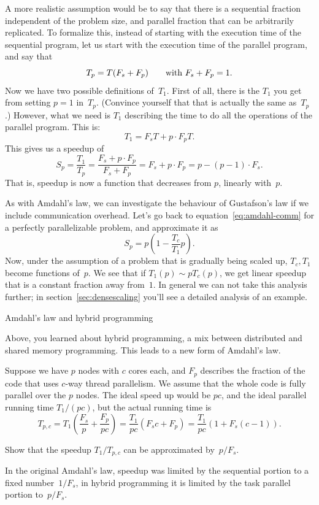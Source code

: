 A more realistic assumption would be to say that there is a  sequential
fraction independent of the problem size, and parallel fraction that
can be arbitrarily replicated.  To formalize this, instead of starting
with the execution time of the sequential program, let us start with
the execution time of the parallel program, and say that
\[ T_p=T(F_s+F_p) \qquad\hbox{with $F_s+F_p=1$}. \]
Now we have two possible definitions of~$T_1$. First of all, there is the $T_1$ 
you get from setting $p=1$ in~$T_p$. (Convince yourself that that is actually 
the same as~$T_p$.) However, what we need is $T_1$ describing the time
to do all the operations of the parallel program.
This is:
\[ T_1=F_sT+p\cdot F_pT. \]
This gives us a speedup of
\[ S_p=\frac{T_1}{T_p}=\frac{F_s+p\cdot F_p}{F_s+F_p}
   = F_s+p\cdot F_p = p-(p-1)\cdot F_s. 
\]
That is, speedup is now a function that decreases from $p$, linearly
with~$p$.

As with Amdahl's law, we can investigate the behaviour of Gustafson's
law if we include communication overhead. Let's go back to
equation~\eqref{eq:amdahl-comm} for a perfectly parallelizable
problem, and approximate it as
\[ S_p = p(1-\frac{T_c}{T_1}p). \]
Now, under the assumption of a problem that is gradually being scaled up,
$T_c,T_1$ become functions of~$p$. We see that if $T_1(p)\sim pT_c(p)$,
we get linear speedup that is a constant fraction away from~$1$.
In general we can not take this analysis further; in section~\ref{sec:densescaling}
you'll see a detailed analysis of an example. 


 {Amdahl's law and hybrid programming}

Above, you learned about hybrid programming, a mix between distributed
and shared memory programming. This leads to a new form of Amdahl's
law.

Suppose we have $p$ nodes with $c$ cores each, and $F_p$ describes the fraction
of the code that uses $c$-way thread parallelism. We assume that the
whole code is fully parallel over the $p$ nodes.
The ideal speed up would be $p c$, and the ideal parallel running
time $T_1/(pc)$, but the actual running time is 
\[
  T_{p,c} = T_1 \left(\frac {F_s}{p} + \frac{F_p}{p c}\right)
  = \frac{T_1}{pc}\left( F_sc+F_p\right) 
  = \frac{T_1}{pc}\left( 1+ F_s(c-1)\right).
\]
\begin{exercise}
  Show that the speedup $T_1/T_{p,c}$ can be approximated by~$p/F_s$.
\end{exercise}
In the original Amdahl's law, speedup was limited by the sequential
portion to a fixed number~$1/F_s$, in hybrid programming it is limited
by the task parallel portion to~$p/F_s$.

